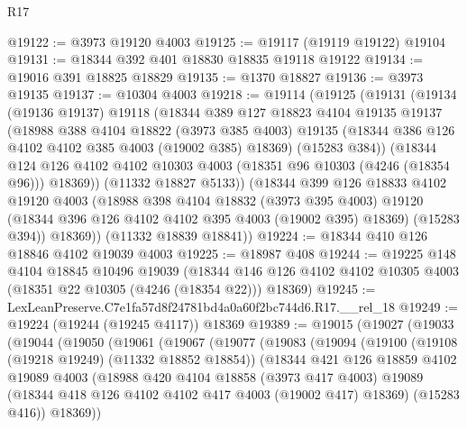 \begin{lexlean}{R17}
\begin{coremodule}
@19122 := @3973 @19120 @4003
@19125 := @19117 (@19119 @19122) @19104
@19131 := @18344 @392 @401 @18830 @18835 @19118 @19122
@19134 := @19016 @391 @18825 @18829
@19135 := @1370 @18827
@19136 := @3973 @19135
@19137 := @10304 @4003
@19218 := @19114
    (@19125
      (@19131
        (@19134
          (@19136 @19137)
          @19118
          (@18344
            @389
            @127
            @18823
            @4104
            @19135
            @19137
            (@18988
              @388
              @4104
              @18822
              (@3973 @385 @4003)
              @19135
              (@18344 @386 @126 @4102 @4102 @385 @4003 (@19002 @385) @18369)
              (@15283 @384))
            (@18344
              @124
              @126
              @4102
              @4102
              @10303
              @4003
              (@18351 @96 @10303 (@4246 (@18354 @96)))
              @18369))
          (@11332 @18827 @5133))
        (@18344
          @399
          @126
          @18833
          @4102
          @19120
          @4003
          (@18988
            @398
            @4104
            @18832
            (@3973 @395 @4003)
            @19120
            (@18344 @396 @126 @4102 @4102 @395 @4003 (@19002 @395) @18369)
            (@15283 @394))
          @18369))
      (@11332 @18839 @18841))
@19224 := @18344 @410 @126 @18846 @4102 @19039 @4003
@19225 := @18987 @408
@19244 := @19225
    @148
    @4104
    @18845
    @10496
    @19039
    (@18344 @146 @126 @4102 @4102 @10305 @4003 (@18351 @22 @10305 (@4246 (@18354 @22))) @18369)
@19245 := LexLeanPreserve.C7e1fa57d8f24781bd4a0a60f2bc744d6.R17.__rel_18
@19249 := @19224 (@19244 (@19245 @4117)) @18369
@19389 := @19015
    (@19027
      (@19033
        (@19044
          (@19050
            (@19061
              (@19067
                (@19077
                  (@19083
                    (@19094
                      (@19100
                        (@19108 (@19218 @19249) (@11332 @18852 @18854))
                        (@18344
                          @421
                          @126
                          @18859
                          @4102
                          @19089
                          @4003
                          (@18988
                            @420
                            @4104
                            @18858
                            (@3973 @417 @4003)
                            @19089
                            (@18344 @418 @126 @4102 @4102 @417 @4003 (@19002 @417) @18369)
                            (@15283 @416))
                          @18369))

\end{coremodule}
\end{lexlean}
